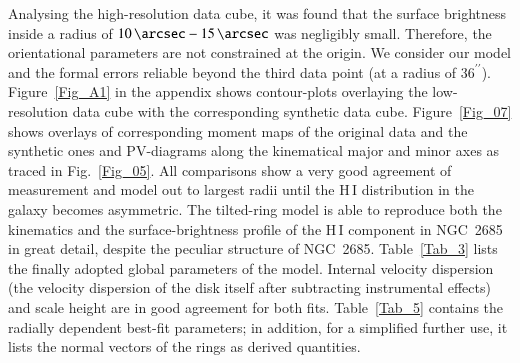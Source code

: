 \documentclass[oldversion]{aa}
\begin{document}
Analysing the high-resolution data cube, it was found that the
 surface brightness inside a radius of
$10\,\arcsec-15\,\arcsec$ was negligibly small.  Therefore, the
orientational parameters are not constrained at the origin. We
consider our model and the formal errors reliable beyond the third
data point (at a radius of $36^{\prime\prime}$).  Figure~\ref{Fig_A1}
in the appendix shows contour-plots overlaying the low-resolution data
cube with the corresponding synthetic data cube.  Figure~\ref{Fig_07}
shows overlays of corresponding moment maps of the original data and
the synthetic ones and PV-diagrams along the kinematical major and
minor axes as traced in Fig.~\ref{Fig_05}. All comparisons show a very
good agreement of measurement and model out to largest radii until the
{H\,{\small I}} distribution in the galaxy becomes asymmetric. The
tilted-ring model is able to reproduce both the kinematics and the
surface-brightness profile of the {H\,{\small I}} component in
NGC~2685 in great detail, despite the peculiar structure of NGC~2685.
Table~\ref{Tab_3} lists the finally adopted global parameters of the
model. Internal velocity dispersion (the velocity dispersion of the
 disk itself after subtracting instrumental effects) and
scale height are in good agreement for both fits. Table~\ref{Tab_5}
contains the radially dependent best-fit parameters; in addition, for
a simplified further use, it lists the normal vectors of the rings as
derived quantities.
\end{document}
